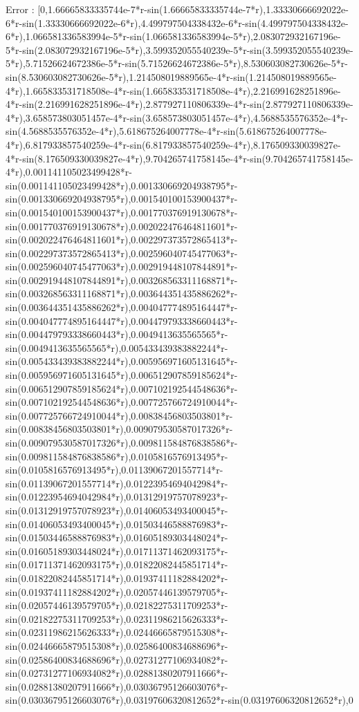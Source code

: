 \documentclass{article}
\begin{document}
\begin{eulernotebook}
\begin{eulercomment}
\begin{eulercomment}
\begin{eulercomment}
\begin{eulercomment}
\begin{eulercomment}
\begin{eulercomment}
\begin{eulercomment}
\begin{eulercomment}
\begin{eulercomment}
\begin{eulercomment}
\begin{eulercomment}
\begin{eulercomment}
\begin{eulercomment}
\begin{eulercomment}
\begin{eulercomment}
\begin{eulercomment}
\begin{eulercomment}
\begin{eulercomment}
\begin{euleroutput}
  Error : [0,1.66665833335744e-7*r-sin(1.66665833335744e-7*r),1.33330666692022e-6*r-sin(1.33330666692022e-6*r),4.499797504338432e-6*r-sin(4.499797504338432e-6*r),1.066581336583994e-5*r-sin(1.066581336583994e-5*r),2.083072932167196e-5*r-sin(2.083072932167196e-5*r),3.599352055540239e-5*r-sin(3.599352055540239e-5*r),5.71526624672386e-5*r-sin(5.71526624672386e-5*r),8.530603082730626e-5*r-sin(8.530603082730626e-5*r),1.214508019889565e-4*r-sin(1.214508019889565e-4*r),1.665833531718508e-4*r-sin(1.665833531718508e-4*r),2.216991628251896e-4*r-sin(2.216991628251896e-4*r),2.877927110806339e-4*r-sin(2.877927110806339e-4*r),3.658573803051457e-4*r-sin(3.658573803051457e-4*r),4.5688535576352e-4*r-sin(4.5688535576352e-4*r),5.618675264007778e-4*r-sin(5.618675264007778e-4*r),6.817933857540259e-4*r-sin(6.817933857540259e-4*r),8.176509330039827e-4*r-sin(8.176509330039827e-4*r),9.704265741758145e-4*r-sin(9.704265741758145e-4*r),0.001141105023499428*r-sin(0.001141105023499428*r),0.001330669204938795*r-sin(0.001330669204938795*r),0.001540100153900437*r-sin(0.001540100153900437*r),0.001770376919130678*r-sin(0.001770376919130678*r),0.002022476464811601*r-sin(0.002022476464811601*r),0.002297373572865413*r-sin(0.002297373572865413*r),0.002596040745477063*r-sin(0.002596040745477063*r),0.002919448107844891*r-sin(0.002919448107844891*r),0.003268563311168871*r-sin(0.003268563311168871*r),0.003644351435886262*r-sin(0.003644351435886262*r),0.004047774895164447*r-sin(0.004047774895164447*r),0.004479793338660443*r-sin(0.004479793338660443*r),0.0049413635565565*r-sin(0.0049413635565565*r),0.005433439383882244*r-sin(0.005433439383882244*r),0.005956971605131645*r-sin(0.005956971605131645*r),0.006512907859185624*r-sin(0.006512907859185624*r),0.007102192544548636*r-sin(0.007102192544548636*r),0.007725766724910044*r-sin(0.007725766724910044*r),0.00838456803503801*r-sin(0.00838456803503801*r),0.009079530587017326*r-sin(0.009079530587017326*r),0.009811584876838586*r-sin(0.009811584876838586*r),0.0105816576913495*r-sin(0.0105816576913495*r),0.01139067201557714*r-sin(0.01139067201557714*r),0.01223954694042984*r-sin(0.01223954694042984*r),0.01312919757078923*r-sin(0.01312919757078923*r),0.01406053493400045*r-sin(0.01406053493400045*r),0.01503446588876983*r-sin(0.01503446588876983*r),0.01605189303448024*r-sin(0.01605189303448024*r),0.01711371462093175*r-sin(0.01711371462093175*r),0.01822082445851714*r-sin(0.01822082445851714*r),0.01937411182884202*r-sin(0.01937411182884202*r),0.02057446139579705*r-sin(0.02057446139579705*r),0.02182275311709253*r-sin(0.02182275311709253*r),0.02311986215626333*r-sin(0.02311986215626333*r),0.02446665879515308*r-sin(0.02446665879515308*r),0.02586400834688696*r-sin(0.02586400834688696*r),0.02731277106934082*r-sin(0.02731277106934082*r),0.02881380207911666*r-sin(0.02881380207911666*r),0.03036795126603076*r-sin(0.03036795126603076*r),0.03197606320812652*r-sin(0.03197606320812652*r),0
\end{euleroutput}
\end{eulercomment}
\end{eulercomment}
\end{eulercomment}
\end{eulercomment}
\end{eulercomment}
\end{eulercomment}
\end{eulercomment}
\end{eulercomment}
\end{eulercomment}
\end{eulercomment}
\end{eulercomment}
\end{eulercomment}
\end{eulercomment}
\end{eulercomment}
\end{eulercomment}
\end{eulercomment}
\end{eulercomment}
\end{eulercomment}
\end{eulernotebook}
\end{document}
